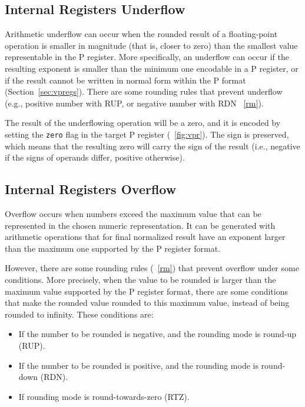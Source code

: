 \subsection{Internal Registers Underflow}

Arithmetic underflow can occur when the rounded result of a floating-point operation is smaller in magnitude (that is, closer to zero) than the smallest value representable in the P register.
More specifically, an underflow can occur if the resulting exponent is smaller than the minimum one encodable in a P register, or if the result cannot be written in normal form within the P format (Section~\ref{sec:vpregs}).
There are some rounding rules that prevent underflow (e.g., positive number with RUP, or negative number with RDN \figurename~\ref{rm}).

The result of the underflowing operation will be a zero, and it is encoded by setting the \texttt{zero} flag in the target P register (\figurename~\ref{fig:vpr}).
The sign is preserved, which means that the resulting zero will carry the sign of the result (i.e., negative if the signs of operands differ, positive otherwise).

\subsection{Internal Registers Overflow}

Overflow occurs when numbers exceed the maximum value that can be represented in the chosen numeric representation.
It can be generated with arithmetic operations that for final normalized result have an exponent larger than the maximum one supported by the P register format.

However, there are some rounding rules (\figurename~\ref{rm}) that prevent overflow under some conditions.
More precisely, when the value to be rounded is larger than the maximum value supported by the P register format, there are some conditions that make the rounded value rounded to this maximum value, instead of being rounded to infinity.
These conditions are:
\begin{itemize}
    \item If the number to be rounded is negative, and the rounding mode is round-up (RUP).
    \item If the number to be rounded is positive, and the rounding mode is round-down (RDN).
    \item If rounding mode is round-towards-zero (RTZ).
\end{itemize}


